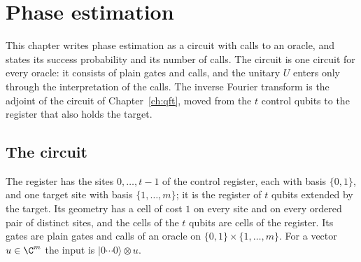 \chapter{Phase estimation}
\label{ch:phase_estimation}

This chapter writes phase estimation \cite[\S5.2]{NielsenChuang2010} as a circuit with
calls to an oracle, and states its success probability and its number of calls. The
circuit is one circuit for every oracle: it consists of plain gates and calls, and the
unitary $U$ enters only through the interpretation of the calls. The inverse Fourier
transform is the adjoint of the circuit of Chapter~\ref{ch:qft}, moved from the $t$
control qubits to the register that also holds the target.

\section{The circuit}
\label{sec:phase_estimation_circuit}

\begin{definition}
    \label{def:phase_estimation_register}
    \leanok
    The register has the sites $0,\dots,t-1$ of the control register, each with basis
    $\{0,1\}$, and one target site with basis $\{1,\dots,m\}$; it is the register of
    $t$ qubits extended by the target. Its geometry has a cell of cost $1$ on every
    site and on every ordered pair of distinct sites, and the cells of the $t$ qubits
    are cells of the register. Its gates are plain gates and calls of an oracle on
    $\{0,1\}\times\{1,\dots,m\}$. For a vector $u\in\C^m$ the input is
    $\lvert0\cdots0\rangle\otimes u$.
\end{definition}

